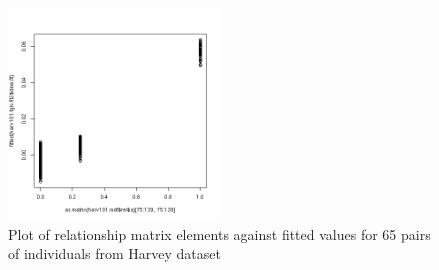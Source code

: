 %

\begin{figure}[ht]
  \centering
  \includegraphics[width=0.5\textwidth]{relvsfitted.png}
  \caption{Plot of relationship matrix elements against fitted values for 65 pairs
           of individuals from Harvey dataset}
  \label{fig:rvf}
\end{figure}

%


